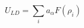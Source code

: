 \documentclass[12pt]{article}
\begin{document}
$$
U_{LD} = \sum_i a_\alpha F(\rho_i)
$$
\end{document}

